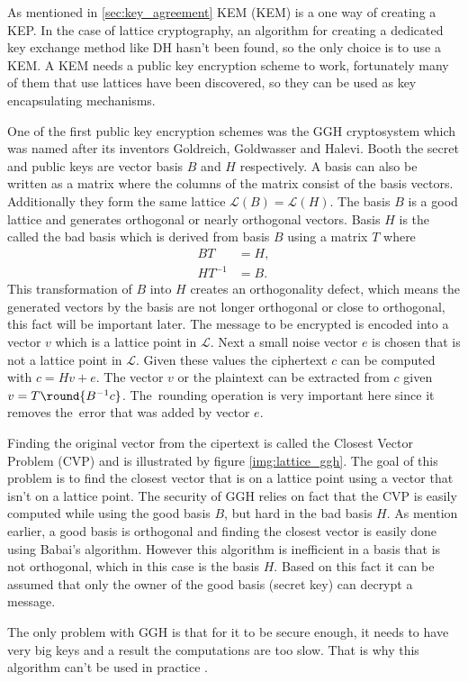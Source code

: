 As mentioned in \ref{sec:key_agreement} KEM (\acl{KEM}) is a one way of creating a KEP. In the case of lattice cryptography, an algorithm for creating a dedicated key exchange method like DH hasn't been found, so the only choice is to use a KEM. A KEM needs a public key encryption scheme to work, fortunately many of them that use lattices have been discovered, so they can be used as key encapsulating mechanisms. 

One of the first public key encryption schemes was the GGH cryptosystem which was named after its inventors Goldreich, Goldwasser and Halevi. Booth the secret and public keys are vector basis $B$ and $H$ respectively. A basis can also be written as a matrix where the columns of the matrix consist of the basis vectors. Additionally they form the same lattice $\mathcal{L}(B)=\mathcal{L}(H)$. The basis $B$ is a good lattice and generates orthogonal or nearly orthogonal vectors. Basis $H$ is the called the bad basis which is derived from basis $B$ using a matrix $T$ where
\begin{equation}
  \begin{aligned}
    BT&=H, \\
    HT^{-1}&=B.
  \end{aligned}
\end{equation}
This transformation of $B$ into $H$ creates an orthogonality defect, which means the generated vectors by the basis are not longer orthogonal or close to orthogonal, this fact will be important later. The message to be encrypted is encoded into a vector $v$ which is a lattice point in $\mathcal{L}$. Next a small noise vector $e$ is chosen that is not a lattice point in $\mathcal{L}$. Given these values the ciphertext $c$ can be computed with $c = Hv + e$. The vector $v$ or the plaintext can be extracted from $c$ given $v=T \round{B^{-1}c}$. The~rounding operation is very important here since it removes the~error that was added by vector $e$. \cite{Bernstein2009}\cite{Goldreich1997}


Finding the original vector from the cipertext is called the Closest Vector Problem (CVP) and is illustrated by figure \ref{img:lattice_ggh}. The goal of this problem is to find the closest vector that is on a lattice point using a vector that isn't on a lattice point. The security of GGH relies on fact that the CVP is easily computed while using the good basis $B$, but hard in the bad basis $H$. As mention earlier, a good basis is orthogonal and finding the closest vector is easily done using Babai's algorithm. However this algorithm is inefficient in a basis that is not orthogonal, which in this case is the basis $H$. Based on this fact it can be assumed that only the owner of the good basis (secret key) can decrypt a message. \cite{Goldreich1997} 

The only problem with GGH is that for it to be secure enough, it needs to have very big keys and a result the computations are too slow. That is why this algorithm can't be used in practice \cite{Bernstein2009}.
